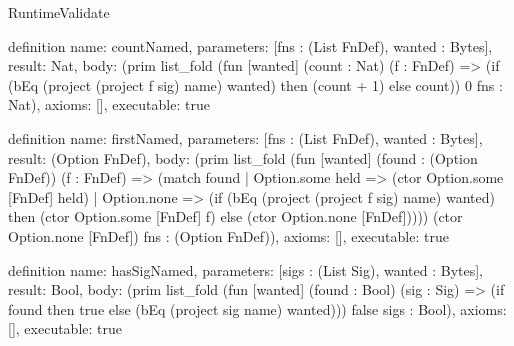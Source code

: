 \begin{lexlean}{RuntimeValidate}
\begin{semanticmodule}
definition{
  name: countNamed,
  parameters: [fns : (List FnDef), wanted : Bytes],
  result: Nat,
  body: (prim list_fold (fun [wanted] (count : Nat) (f : FnDef) => (if (bEq (project (project f sig) name) wanted) then (count + 1) else count)) 0 fns : Nat),
  axioms: [],
  executable: true
}

definition{
  name: firstNamed,
  parameters: [fns : (List FnDef), wanted : Bytes],
  result: (Option FnDef),
  body: (prim list_fold (fun [wanted] (found : (Option FnDef)) (f : FnDef) => (match found
    | Option.some held => (ctor Option.some [FnDef] held)
    | Option.none => (if (bEq (project (project f sig) name) wanted) then (ctor Option.some [FnDef] f) else (ctor Option.none [FnDef])))) (ctor Option.none [FnDef]) fns : (Option FnDef)),
  axioms: [],
  executable: true
}

definition{
  name: hasSigNamed,
  parameters: [sigs : (List Sig), wanted : Bytes],
  result: Bool,
  body: (prim list_fold (fun [wanted] (found : Bool) (sig : Sig) => (if found then true else (bEq (project sig name) wanted))) false sigs : Bool),
  axioms: [],
  executable: true
}


\end{semanticmodule}
\end{lexlean}
